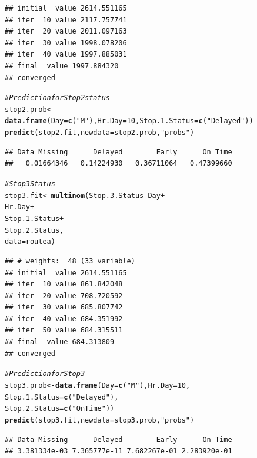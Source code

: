 \documentclass[12pt]{article}\usepackage[]{graphicx}\usepackage[]{color}
\makeatletter
\newcommand{\hlnum}[1]{\textcolor[rgb]{0.686,0.059,0.569}{#1}}%
\newcommand{\hlstr}[1]{\textcolor[rgb]{0.192,0.494,0.8}{#1}}%
\newcommand{\hlcom}[1]{\textcolor[rgb]{0.678,0.584,0.686}{\textit{#1}}}%
\newcommand{\hlopt}[1]{\textcolor[rgb]{0,0,0}{#1}}%
\newcommand{\hlstd}[1]{\textcolor[rgb]{0.345,0.345,0.345}{#1}}%
\newcommand{\hlkwb}[1]{\textcolor[rgb]{0.69,0.353,0.396}{#1}}%
\newcommand{\hlkwc}[1]{\textcolor[rgb]{0.333,0.667,0.333}{#1}}%
\newcommand{\hlkwd}[1]{\textcolor[rgb]{0.737,0.353,0.396}{\textbf{#1}}}%
\newenvironment{kframe}{%
 \def\at@end@of@kframe{}%
 \ifinner\ifhmode%
  \def\at@end@of@kframe{\end{minipage}}%
  \begin{minipage}{\columnwidth}%
 \fi\fi%
 \def\FrameCommand##1{\hskip\@totalleftmargin \hskip-\fboxsep
 \colorbox{shadecolor}{##1}\hskip-\fboxsep
     \hskip-\linewidth \hskip-\@totalleftmargin \hskip\columnwidth}%
 \MakeFramed {\advance\hsize-\width
   \@totalleftmargin\z@ \linewidth\hsize
   \@setminipage}}%
 {\par\unskip\endMakeFramed%
 \at@end@of@kframe}
\newenvironment{knitrout}{}{} %
\makeatother
\begin{document}
\begin{knitrout}
\begin{kframe}
\begin{verbatim}
## initial  value 2614.551165 
## iter  10 value 2117.757741
## iter  20 value 2011.097163
## iter  30 value 1998.078206
## iter  40 value 1997.885031
## final  value 1997.884320 
## converged
\end{verbatim}
\begin{alltt}
\hlcom{#Prediction for Stop 2 status}
\hlstd{stop2.prob}\hlkwb{<-}\hlkwd{data.frame}\hlstd{(}\hlkwc{Day}\hlstd{=}\hlkwd{c}\hlstd{(}\hlstr{"M"}\hlstd{),}\hlkwc{Hr.Day}\hlstd{=}\hlnum{10}\hlstd{,}\hlkwc{Stop.1.Status}\hlstd{=}\hlkwd{c}\hlstd{(}\hlstr{"Delayed"}\hlstd{))}
\hlkwd{predict}\hlstd{(stop2.fit,}\hlkwc{newdata} \hlstd{= stop2.prob,}\hlstr{"probs"}\hlstd{)}
\end{alltt}
\begin{verbatim}
## Data Missing      Delayed        Early      On Time 
##   0.01664346   0.14224930   0.36711064   0.47399660
\end{verbatim}
\begin{alltt}
\hlcom{#Stop 3 Status}
\hlstd{stop3.fit}\hlkwb{<-}\hlkwd{multinom}\hlstd{(Stop.3.Status}\hlopt{~}\hlstd{Day}\hlopt{+}
                                                \hlstd{Hr.Day}\hlopt{+}
                                                \hlstd{Stop.1.Status}\hlopt{+}
                                                \hlstd{Stop.2.Status,}
                                        \hlkwc{data}\hlstd{=routea)}
\end{alltt}
\begin{verbatim}
## # weights:  48 (33 variable)
## initial  value 2614.551165 
## iter  10 value 861.842048
## iter  20 value 708.720592
## iter  30 value 685.807742
## iter  40 value 684.351992
## iter  50 value 684.315511
## final  value 684.313809 
## converged
\end{verbatim}
\begin{alltt}
\hlcom{#Prediction for Stop 3}
\hlstd{stop3.prob}\hlkwb{<-}\hlkwd{data.frame}\hlstd{(}\hlkwc{Day}\hlstd{=}\hlkwd{c}\hlstd{(}\hlstr{"M"}\hlstd{),}\hlkwc{Hr.Day}\hlstd{=}\hlnum{10}\hlstd{,}
                                           \hlkwc{Stop.1.Status}\hlstd{=}\hlkwd{c}\hlstd{(}\hlstr{"Delayed"}\hlstd{),}
                                           \hlkwc{Stop.2.Status}\hlstd{=}\hlkwd{c}\hlstd{(}\hlstr{"On Time"}\hlstd{))}
\hlkwd{predict}\hlstd{(stop3.fit,}\hlkwc{newdata} \hlstd{= stop3.prob,}\hlstr{"probs"}\hlstd{)}
\end{alltt}
\begin{verbatim}
## Data Missing      Delayed        Early      On Time 
## 3.381334e-03 7.365777e-11 7.682267e-01 2.283920e-01

\end{verbatim}
\end{kframe}
\end{knitrout}
\end{document}

